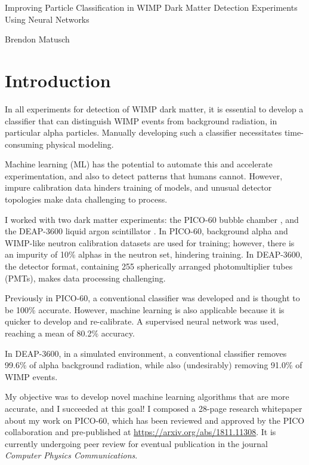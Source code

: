 \documentclass[12pt]{article}
\begin{document}
\begin{center}
    \begin{LARGE}
        Improving Particle Classification in WIMP Dark Matter Detection Experiments Using Neural Networks
    \end{LARGE}

    Brendon Matusch
\end{center}

\section{Introduction}

In all experiments for detection of WIMP dark matter, it is essential to develop a classifier that can distinguish WIMP events from background radiation, in particular alpha particles. Manually developing such a classifier necessitates time-consuming physical modeling.

Machine learning (ML) has the potential to automate this and accelerate experimentation, and also to detect patterns that humans cannot. However, impure calibration data hinders training of models, and unusual detector topologies make data challenging to process.

I worked with two dark matter experiments: the PICO-60 bubble chamber \cite{pico}, and the DEAP-3600 liquid argon scintillator \cite{deap}. In PICO-60, background alpha and WIMP-like neutron calibration datasets are used for training; however, there is an impurity of 10\% alphas in the neutron set, hindering training. In DEAP-3600, the detector format, containing 255 spherically arranged photomultiplier tubes (PMTs), makes data processing challenging.

Previously in PICO-60, a conventional classifier was developed and is thought to be 100\% accurate. However, machine learning is also applicable because it is quicker to develop and re-calibrate. A supervised neural network was used, reaching a mean of 80.2\% accuracy.

In DEAP-3600, in a simulated environment, a conventional classifier removes 99.6\% of alpha background radiation, while also (undesirably) removing 91.0\% of WIMP events.

My objective was to develop novel machine learning algorithms that are more accurate, and I succeeded at this goal! I composed a 28-page research whitepaper \cite{me} about my work on PICO-60, which has been reviewed and approved by the PICO collaboration and pre-published at \url{https://arxiv.org/abs/1811.11308}. It is currently undergoing peer review for eventual publication in the journal \textit{Computer Physics Communications}.
\end{document}
